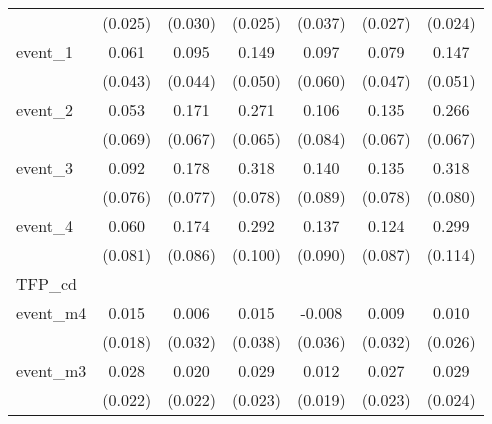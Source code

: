 {\begin{tabular}{l*{6}{c}}
            &     (0.025)         &     (0.030)         &     (0.025)         &     (0.037)         &     (0.027)         &     (0.024)         \\
[1em]
event\_1     &       0.061         &       0.095\sym{*}  &       0.149\sym{**} &       0.097         &       0.079         &       0.147\sym{**} \\
            &     (0.043)         &     (0.044)         &     (0.050)         &     (0.060)         &     (0.047)         &     (0.051)         \\
[1em]
event\_2     &       0.053         &       0.171\sym{*}  &       0.271\sym{***}&       0.106         &       0.135\sym{*}  &       0.266\sym{***}\\
            &     (0.069)         &     (0.067)         &     (0.065)         &     (0.084)         &     (0.067)         &     (0.067)         \\
[1em]
event\_3     &       0.092         &       0.178\sym{*}  &       0.318\sym{***}&       0.140         &       0.135         &       0.318\sym{***}\\
            &     (0.076)         &     (0.077)         &     (0.078)         &     (0.089)         &     (0.078)         &     (0.080)         \\
[1em]
event\_4     &       0.060         &       0.174\sym{*}  &       0.292\sym{**} &       0.137         &       0.124         &       0.299\sym{**} \\
            &     (0.081)         &     (0.086)         &     (0.100)         &     (0.090)         &     (0.087)         &     (0.114)         \\
\hline
TFP\_cd      &                     &                     &                     &                     &                     &                     \\
event\_m4    &       0.015         &       0.006         &       0.015         &      -0.008         &       0.009         &       0.010         \\
            &     (0.018)         &     (0.032)         &     (0.038)         &     (0.036)         &     (0.032)         &     (0.026)         \\
[1em]
event\_m3    &       0.028         &       0.020         &       0.029         &       0.012         &       0.027         &       0.029         \\
            &     (0.022)         &     (0.022)         &     (0.023)         &     (0.019)         &     (0.023)         &     (0.024)         \\

\end{tabular}}

